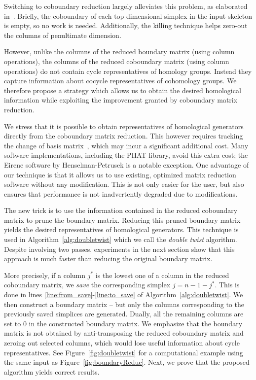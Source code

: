 Switching to coboundary reduction largely alleviates this problem, as elaborated in~\cite{deSilva_2011, phat, bauer2021ripser}. Briefly, the coboundary of each top-dimensional simplex in the input skeleton is empty, so no work is needed. Additionally, the killing technique helps zero-out the columns of penultimate dimension.

However, unlike the columns of the reduced boundary matrix (using column operations), the columns of the reduced coboundary matrix (using column operations) do not contain cycle representatives of homology groups. Instead they capture information about cocycle representatives of cohomology groups. We therefore propose a strategy which allows us to obtain the desired homological information while exploiting the improvement granted by coboundary matrix reduction.

We stress that it is possible to obtain representatives of homological generators directly from the coboundary matrix reduction. This however requires tracking the change of basis matrix~\cite{deSilva_2011}, which may incur a significant additional cost. Many software implementations, including the PHAT library, avoid this extra cost; the Eirene software by Henselman-Petrusek is a notable exception. One advantage of our technique is that it allows us to use existing, optimized matrix reduction software without any modification. This is not only easier for the user, but also ensures that performance is not inadvertently degraded due to modifications.

The new trick is to use the information contained in the reduced coboundary matrix to prune the boundary matrix. Reducing this pruned boundary matrix yields the desired representatives of homological generators. This technique is used in Algorithm~\ref{alg:doubletwist} which we call the \emph{double twist} algorithm. Despite involving two passes, experiments in the next section show that this approach is much faster than reducing the original boundary matrix.

More precisely, if a column $j^*$ is the lowest one of a column in the reduced coboundary matrix, we \emph{save} the corresponding simplex $j = n-1-j^*$. This is done in lines \ref{line:from_save}-\ref{line:to_save} of Algorithm~\ref{alg:doubletwist}. We then construct a boundary matrix -- but only the columns corresponding to the previously saved simplices are generated. Dually, all the remaining columns are set to 0 in the constructed boundary matrix. We emphasize that the boundary matrix is not obtained by anti-transposing the reduced coboundary matrix and zeroing out selected columns, which would lose useful information about cycle representatives. See Figure~\ref{fig:doubletwist} for a computational example using the same input as Figure~\ref{fig:boundaryReduc}. Next, we prove that the proposed algorithm yields correct results.

